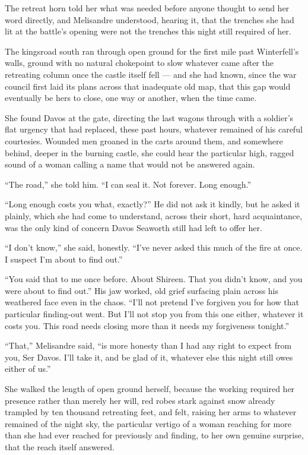 The retreat horn told her what was needed before anyone thought to send her word directly, and Melisandre understood, hearing it, that the trenches she had lit at the battle’s opening were not the trenches this night still required of her.

The kingsroad south ran through open ground for the first mile past Winterfell’s walls, ground with no natural chokepoint to slow whatever came after the retreating column once the castle itself fell — and she had known, since the war council first laid its plans across that inadequate old map, that this gap would eventually be hers to close, one way or another, when the time came.

She found Davos at the gate, directing the last wagons through with a soldier’s flat urgency that had replaced, these past hours, whatever remained of his careful courtesies. Wounded men groaned in the carts around them, and somewhere behind, deeper in the burning castle, she could hear the particular high, ragged sound of a woman calling a name that would not be answered again.

“The road,” she told him. “I can seal it. Not forever. Long enough.”

“Long enough costs you what, exactly?” He did not ask it kindly, but he asked it plainly, which she had come to understand, across their short, hard acquaintance, was the only kind of concern Davos Seaworth still had left to offer her.

“I don’t know,” she said, honestly. “I’ve never asked this much of the fire at once. I suspect I’m about to find out.”

“You said that to me once before. About Shireen. That you didn’t know, and you were about to find out.” His jaw worked, old grief surfacing plain across his weathered face even in the chaos. “I’ll not pretend I’ve forgiven you for how that particular finding-out went. But I’ll not stop you from this one either, whatever it costs you. This road needs closing more than it needs my forgiveness tonight.”

“That,” Melisandre said, “is more honesty than I had any right to expect from you, Ser Davos. I’ll take it, and be glad of it, whatever else this night still owes either of us.”

\sceneBreak

She walked the length of open ground herself, because the working required her presence rather than merely her will, red robes stark against snow already trampled by ten thousand retreating feet, and felt, raising her arms to whatever remained of the night sky, the particular vertigo of a woman reaching for more than she had ever reached for previously and finding, to her own genuine surprise, that the reach itself answered.

